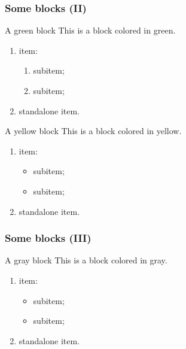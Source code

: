 \documentclass{beamerunicatt}
\begin{document}
\begin{frame}
\frametitle{Some blocks (II)}
\begin{exampleblock}{A green block}
This is a block colored in green.

\begin{enumerate}
\item {} item:
\begin{enumerate}
\item {} subitem;
\item {} subitem;
\end{enumerate}
\item {} standalone item.
\end{enumerate}
\end{exampleblock}

\begin{remarkblock}{A yellow block}
This is a block colored in yellow.

\begin{enumerate}
\item {} item:
\begin{itemize}
\item {} subitem;
\item {} subitem;
\end{itemize}
\item {} standalone item.
\end{enumerate}
\end{remarkblock}
\end{frame}

\begin{frame}
\frametitle{Some blocks (III)}
\begin{proofblock}{A gray block}
This is a block colored in gray.

\begin{enumerate}
\item {} item:
\begin{itemize}
\item {} subitem;
\item {} subitem;
\end{itemize}
\item {} standalone item.
\end{enumerate}
\end{proofblock}
\end{frame}
\end{document}
